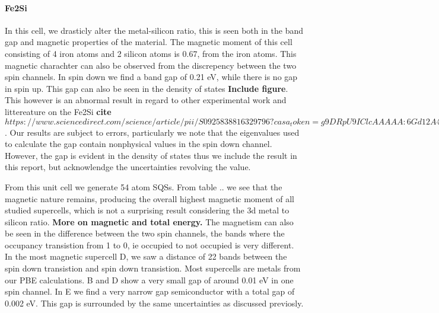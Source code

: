 \paragraph{Fe2Si \\}
In this cell, we drasticly alter the metal-silicon ratio, this is seen both in the band gap and magnetic properties of the material. The magnetic moment of this cell consisting of 4 iron atoms and 2 silicon atoms is 0.67, from the iron atoms. This magnetic charachter can also be observed from the discrepency between the two spin channels. In spin down we find a band gap of 0.21 eV, while there is no gap in spin up. This gap can also be seen in the density of states \textbf{Include figure}. This however is an abnormal result in regard to other experimental work and littereature on the Fe2Si \textbf{cite $https://www.sciencedirect.com/science/article/pii/S0925838816329796?casa_token=g9DRpU9IClcAAAAA:6Gd12A4Kh9J2igUWMVwHN8OSIKzD27VACA052FNsSAWhRY6PELWdVEPbiF8OtQ3eJEAbvQ8X0g$}. Our results are subject to errors, particularly we note that the eigenvalues used to calculate the gap contain nonphysical values in the spin down channel. However, the gap is evident in the density of states thus we include the result in this report, but acknowlendge the uncertainties revolving the value. 

From this unit cell we generate 54 atom SQSs. From table .. we see that the magnetic nature remains, producing the overall highest magnetic moment of all studied supercells, which is not a surprising result considering the 3d metal to silicon ratio. \textbf{More on magnetic and total energy.} The magnetism can also be seen in the difference between the two spin channels, the bands where the occupancy transistion from 1 to 0, ie occupied to not occupied is very different. In the most magnetic supercell D, we saw a distance of 22 bands between the spin down transistion and spin down transistion. Most supercells are metals from our PBE calculations. B and D show a very small gap of around 0.01 eV in one spin channel.  In E we find a very narrow gap semiconductor with a total gap of 0.002 eV. This gap is surrounded by the same uncertainties as discussed previosly.  
